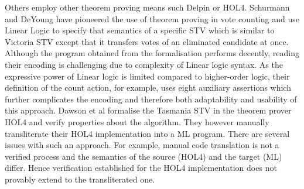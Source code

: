 \documentclass[10pt,conference]{IEEEtran}
\begin{document}
Others employ other theorem proving means such Delpin \cite{Dolphin} or HOL4.
Schurmann and DeYoung \cite{DeYoung:2012:LLV}
have pioneered the use of theorem proving in vote
counting and use Linear Logic \cite{DBLP:journals/apal/Girard93} to specify that semantics of a specific STV which is similar to Victoria STV except that it transfers votes of an eliminated candidate at once. Although the program obtained from the formalisation performs decently, reading their encoding is challenging due to complexity of Linear logic syntax. As the expressive power of Linear logic is limited compared to higher-order
logic, their definition of the count action, for example, uses eight auxiliary assertions which further complicates
the encoding and therefore both adaptability and
usability of this approach.  Dawson et al \cite{DBLP:conf/voteid/DawsonGM15} formalise the Tasmania STV in the theorem prover HOL4 and verify properties about the algorithm. They however manually transliterate their  HOL4
implementation into a ML program. There are several
issues with such an approach. For example, manual code translation is not a verified process and the semantics of the source (HOL4) and the target (ML) differ. Hence verification established for the HOL4 implementation does not provably extend to the transliterated one.



\end{document}
